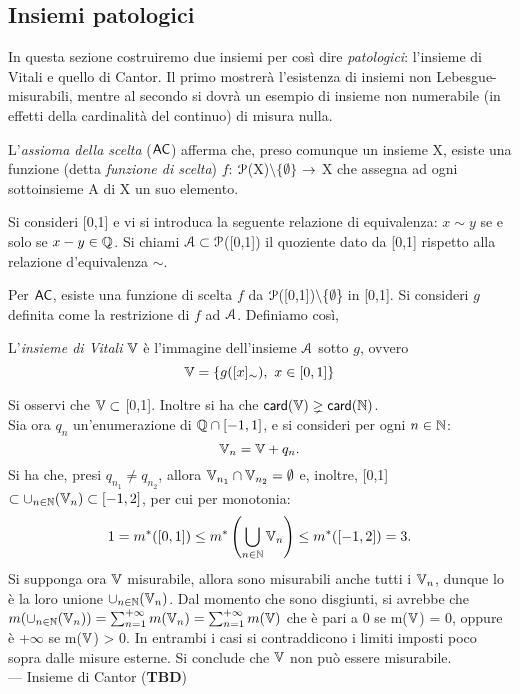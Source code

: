 \documentclass[Completo.tex]{subfiles}
\begin{document}
\subsection{Insiemi patologici}
In questa sezione costruiremo due insiemi per così dire \textit{patologici}: l'insieme di Vitali e quello di Cantor. Il primo mostrerà l'esistenza di insiemi non Lebesgue-misurabili, mentre al secondo si dovrà un esempio di insieme non numerabile (in effetti della cardinalità del continuo) di misura nulla.
\begin{Def}
	L'\textit{assioma della scelta} ($\sf[AC]$) afferma che, preso comunque un insieme X, esiste una funzione (detta \textit{funzione di scelta}) $f$: $\eu[P]$(X)$\setminus \{\emptyset\}$ $\rightarrow$ X che assegna ad ogni sottoinsieme A di X un suo elemento.
\end{Def}
\begin{Def}
	Si consideri [0,1] e vi si introduca la seguente relazione di equivalenza: $x \sim y$ se e solo se $x-y \in \bb[Q]$. Si chiami $\eu[A] \sset \eu[P]$([0,1]) il quoziente dato da [0,1] rispetto alla relazione d'equivalenza $\sim$.
\end{Def}
Per $\sf[AC]$, esiste una funzione di scelta $f$ da $\eu[P]$([0,1])$\setminus$\{$\emptyset$\} in [0,1]. Si consideri $g$ definita come la restrizione di $f$ ad $\eu[A]$. Definiamo così,
\begin{Def}
	L'\textit{insieme di Vitali} $\bb[V]$ è l'immagine dell'insieme $\eu[A]$ sotto $g$, ovvero
	\begin{equation*}
	\bb[V] = \{g([x]_{\sim}), \ x \in [0,1]\}
	\end{equation*}
\end{Def}
Si osservi che $\bb[V] \sset$ [0,1]. Inoltre si ha che $\sf[card](\bb[V]) \gneq \sf[card](\bb[N])$. \\
Sia ora $q_n$ un'enumerazione di $\bb[Q] \cap [-1,1]$, e si consideri per ogni $n \in \bb[N]$:
\begin{equation*}
\bb[V]_n = \bb[V] + q_n.
\end{equation*}
Si ha che, presi $q_{n_1} \neq q_{n_2}$, allora $\bb[V]_{n_1} \cap \bb[V]_{n_2} = \emptyset$ e, inoltre, [0,1] $\sset \cup_{n \in \bb[N]}(\bb[V]_{n}) \sset [-1,2]$, per cui per monotonia:
\begin{equation*}
1 = m^{*}([0,1]) \leq m^{*}\left(\bigcup_{n \in \bb[N]} \bb[V]_n \right) \leq m^{*}([-1,2]) = 3.
\end{equation*}
Si supponga ora $\bb[V]$ misurabile, allora sono misurabili anche tutti i $\bb[V]_n$, dunque lo è la loro unione $\cup_{n \in \bb[N]}(\bb[V]_{n})$. Dal momento che sono disgiunti, si avrebbe che $m(\cup_{n \in \bb[N]}(\bb[V]_{n})) = \sum_{n=1}^{+\infty}m(\bb[V]_n) = \sum_{n=1}^{+\infty}m(\bb[V])$ che è pari a 0 se m($\bb[V]$) = 0, oppure è +$\infty$ se m($\bb[V]$) > 0. In entrambi i casi si contraddicono i limiti imposti poco sopra dalle misure esterne. Si conclude che $\bb[V]$ non può essere misurabile. \\
--- Insieme di Cantor (\textbf{TBD})
\end{document}
